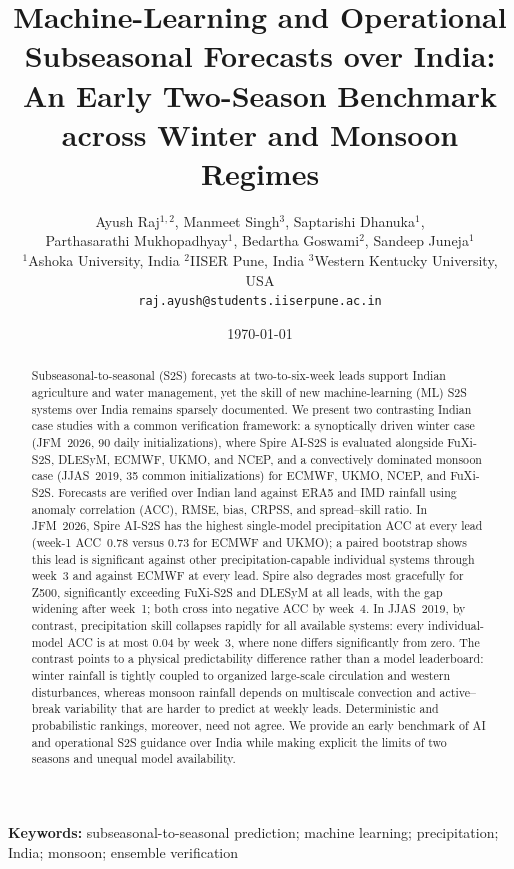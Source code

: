 \documentclass[11pt,a4paper]{article}
\title{\vspace{-1.0cm}\bfseries
  Machine-Learning and Operational Subseasonal Forecasts over India:
  An Early Two-Season Benchmark across Winter and Monsoon Regimes}
\author{%
  Ayush Raj$^{1,2}$, Manmeet Singh$^{3}$, Saptarishi Dhanuka$^{1}$,\\
  Parthasarathi Mukhopadhyay$^{1}$, Bedartha Goswami$^{2}$, Sandeep Juneja$^{1}$\\[0.4em]
  \small $^{1}$Ashoka University, India \quad
  $^{2}$IISER Pune, India \quad
  $^{3}$Western Kentucky University, USA\\
  \small\texttt{raj.ayush@students.iiserpune.ac.in}
}
\date{\today}
\begin{document}
\maketitle

\begin{abstract}
\noindent
Subseasonal-to-seasonal (S2S) forecasts at two-to-six-week leads support
Indian agriculture and water management, yet the skill of new
machine-learning (ML) S2S systems over India remains sparsely documented. We
present two contrasting Indian case studies with a common
verification framework: a synoptically driven winter case (JFM~2026, 90 daily
initializations), where Spire AI-S2S is evaluated alongside FuXi-S2S, DLESyM,
ECMWF, UKMO, and NCEP, and a convectively dominated monsoon case (JJAS~2019,
35 common initializations) for ECMWF, UKMO, NCEP, and FuXi-S2S. Forecasts are
verified over Indian land against ERA5 and IMD rainfall using
anomaly correlation (ACC), RMSE, bias, CRPSS, and
spread--skill ratio. In JFM~2026, Spire AI-S2S has the highest single-model
precipitation ACC at every lead (week-1 ACC~0.78 versus 0.73 for ECMWF and UKMO); a paired
bootstrap shows this lead is significant against other precipitation-capable
individual systems through week~3 and against ECMWF at every lead. Spire also degrades
most gracefully for Z500, significantly exceeding FuXi-S2S and DLESyM at all
leads, with the gap widening after week~1; both cross into negative ACC by
week~4. In
JJAS~2019, by contrast, precipitation skill collapses rapidly for all
available systems: every individual-model ACC is at most 0.04 by week~3,
where none differs significantly from zero. The contrast points to a physical
predictability difference rather than a model leaderboard: winter rainfall is
tightly coupled to organized large-scale circulation and western
disturbances, whereas monsoon rainfall depends on multiscale convection and
active--break variability that are harder to predict at weekly leads.
Deterministic and probabilistic rankings, moreover, need not agree. We provide
an early benchmark of AI and operational S2S guidance over India
while making explicit the limits of two seasons and unequal model availability.
\end{abstract}

\vspace{0.3em}
\noindent\textbf{Keywords:} subseasonal-to-seasonal prediction; machine
learning; precipitation; India; monsoon; ensemble verification
\end{document}
